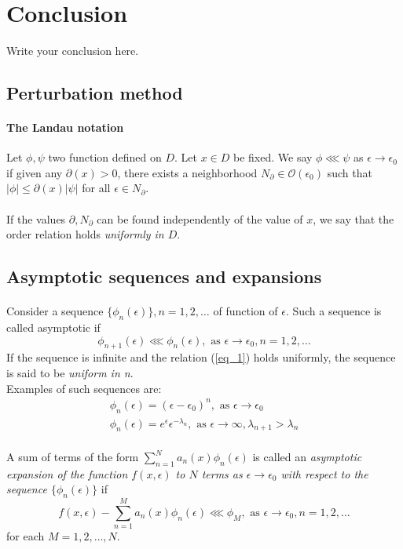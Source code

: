 \documentclass{article}
\begin{document}
\section{Conclusion}
%
Write your conclusion here.
%
\begin{appendices}
%
\section{Perturbation method}
%
\paragraph{The Landau notation} Let $\phi, \psi$ two function defined on $D$. Let $x\in D$ be fixed. We say $\phi\lll\psi$ as $\epsilon\rightarrow\epsilon_0$ if given any $\partial(x)>0$, there exists a neighborhood $N_\partial\in\mathcal O(\epsilon_0)$ such that $|\phi|\leq\partial(x)|\psi|$ for all $\epsilon\in N_\partial$.
\paragraph{} If the values $\partial, N_\partial$ can be found independently of the value of $x$, we say that the order relation holds \emph{uniformly in $D$}.
%
\subsection{Asymptotic sequences and expansions}
\paragraph{} Consider a sequence $\{\phi_n(\epsilon)\}, n=1, 2, \ldots$ of function of $\epsilon$. Such a sequence is called asymptotic if
%
\begin{equation}
%
\phi_{n+1}(\epsilon) \lll \phi_n(\epsilon), \textrm{ as } \epsilon\rightarrow\epsilon_0, n=1, 2, \ldots\label{eq_1}
%
\end{equation}
%
If the sequence is infinite and the relation (\ref{eq_1}) holds uniformly, the sequence is said to be \emph{uniform in n}.\\
%
Examples of such sequences are:
%
\begin{eqnarray}
%
\phi_n(\epsilon) = (\epsilon-\epsilon_0)^n, \textrm{ as } \epsilon\rightarrow\epsilon_0\\
\phi_n(\epsilon) = e^\epsilon\epsilon^{-\lambda_n}, \textrm{ as } \epsilon\rightarrow\infty, \lambda_{n+1} > \lambda_n
%
\end{eqnarray}
%
\paragraph{} A sum of terms of the form $\sum^N_{n=1}a_n(x)\phi_n(\epsilon)$ is called an \emph{asymptotic expansion of the function $f(x, \epsilon)$ to $N$ terms as $\epsilon\rightarrow\epsilon_0$ with respect to the sequence $\{\phi_n(\epsilon)\}$} if 
%
\begin{equation}
%
f(x, \epsilon) - \sum^M_{n=1}a_n(x)\phi_n(\epsilon) \lll \phi_M, \textrm{ as } \epsilon\rightarrow\epsilon_0, n=1, 2, \ldots\label{eq_a_1}
%
\end{equation}
%
for each $M=1, 2, \ldots, N$.
%

\end{appendices}
\end{document}
